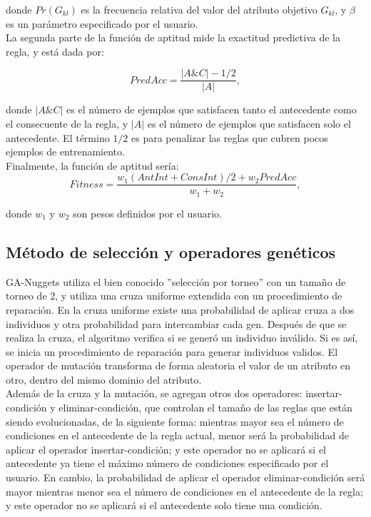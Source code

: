 donde $Pr(G_{kl})$ es la frecuencia relativa del valor del atributo objetivo $G_{kl}$, y $\beta$ es un parámetro especificado por el usuario.
\\
La segunda parte de la función de aptitud mide la exactitud predictiva de la regla, y está dada por:

\begin{equation} \label{eq:6}
PredAcc= \frac{|A\&C|-1/2}{|A|},
\end{equation}

donde $|A\&C|$ es el número de ejemplos que satisfacen tanto el antecedente como el consecuente de la regla, y $|A|$ es el número de ejemplos que satisfacen solo el antecedente. El término $1/2$ es para penalizar las reglas que cubren pocos ejemplos de entrenamiento.
\\
Finalmente, la función de aptitud sería:
\begin{equation} \label{eq:7}
Fitness= \frac{w_1(AntInt+ConsInt)/2+w_2PredAcc}{w_1+w_2},
\end{equation}

donde $w_1$ y $w_2$ son pesos definidos por el usuario.

\subsection{Método de selección y operadores genéticos}

GA-Nuggets utiliza el bien conocido ''selección por torneo'' con un tamaño de torneo de 2, y utiliza una cruza uniforme extendida con un procedimiento de reparación. En la cruza uniforme existe una probabilidad de aplicar cruza a dos individuos y otra probabilidad para intercambiar cada gen. Después de que se realiza la cruza, el algoritmo verifica si se generó un individuo inválido. Si es así, se inicia un procedimiento de reparación para generar individuos validos. El operador de mutación transforma de forma aleatoria el valor de un atributo en otro, dentro del mismo dominio del atributo.
\\
Además de la cruza y la mutación, se agregan otros dos operadores: insertar-condición y eliminar-condición, que controlan el tamaño de las reglas que están siendo evolucionadas, de la siguiente forma: mientras mayor sea el número de condiciones en el antecedente de la regla actual, menor será la probabilidad de aplicar el operador insertar-condición; y este operador no se aplicará si el antecedente ya tiene el máximo número de condiciones especificado por el usuario. En cambio, la probabilidad de aplicar el operador eliminar-condición será mayor mientras menor sea el número de condiciones en el antecedente de la regla; y este operador no se aplicará si el antecedente solo tiene una condición.

